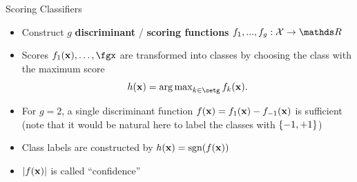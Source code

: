\documentclass[11pt,compress,t,notes=noshow, xcolor=table]{beamer}
\begin{document}
\begin{vbframe}{Scoring Classifiers}
\begin{itemize}
\item Construct $g$ \textbf{discriminant} / \textbf{scoring functions} $f_1, ..., f_g: \Xspace \to \R$
\item Scores $f_1(\xv), \ldots, \fgx$ are transformed into classes by choosing the class with the maximum score
$$
h(\xv) = \argmax_{k \in \setg} \fkx.
$$

\item For $g = 2$, a single discriminant function $f(\mathbf{x}) = f_{1}(\mathbf{x}) - f_{-1}(\mathbf{x})$ is sufficient (note that it would be natural here to label the classes with $\{-1, +1\}$)


\item Class labels are constructed by $h(\mathbf{x}) = \text{sgn}(f(\mathbf{x}))$
\item $|f(\mathbf{x})|$ is called \enquote{confidence}
\end{itemize}
\end{vbframe}
\end{document}
